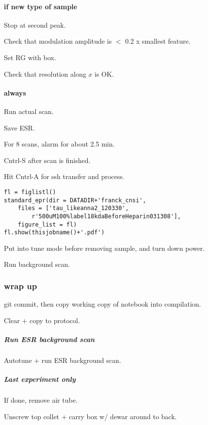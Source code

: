 
\paragraph{if new type of sample}
Stop at second peak.

Check that modulation amplitude is $<$ 0.2 x smallest feature.

Set RG with box.

Check that resolution along $x$ is OK.

\paragraph{always}

Run actual scan.

Save ESR.

For 8 scans, alarm for about 2.5 min.

Cntrl-S after scan is finished.

Hit Cntrl-A for ssh transfer and process.


\begin{tiny}
\begin{lstlisting}
fl = figlistl()
standard_epr(dir = DATADIR+'franck_cnsi',
    files = ['tau_likeanna2_120330',
        r'500uM100%label18kdaBeforeHeparin031308'],
    figure_list = fl)
fl.show(thisjobname()+'.pdf')
\end{lstlisting}
\end{tiny}

Put into tune mode before removing sample, and turn down power.

Run background scan.

\subsubsection{wrap up}
git commit, then copy working copy of notebook into compilation.

Clear + copy to protocol.

\subparagraph{Run ESR background scan}
Autotune + run ESR background scan.

\subparagraph{Last experiment only}
If done, remove air tube.

Unscrew top collet + carry box w/ dewar around to back.

